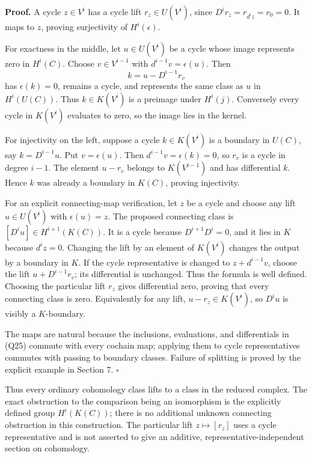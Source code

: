 \documentclass[
]{article}
\begin{document}
\textbf{Proof.} A cycle \(z\in V^i\) has a cycle lift \(r_z\in U(V^i)\),
since \(D^i r_z=r_{d^iz}=r_0=0\). It maps to \(z\), proving surjectivity
of \(H^i(\epsilon)\).

For exactness in the middle, let \(u\in U(V^i)\) be a cycle whose image
represents zero in \(H^i(C)\). Choose \(v\in V^{i-1}\) with
\(d^{i-1}v=\epsilon(u)\). Then \[
k=u-D^{i-1}r_v
\tag{Q27}
\] has \(\epsilon(k)=0\), remains a cycle, and represents the same class
as \(u\) in \(H^i(U(C))\). Thus \(k\in K(V^i)\) is a preimage under
\(H^i(j)\). Conversely every cycle in \(K(V^i)\) evaluates to zero, so
the image lies in the kernel.

For injectivity on the left, suppose a cycle \(k\in K(V^i)\) is a
boundary in \(U(C)\), say \(k=D^{i-1}u\). Put \(v=\epsilon(u)\). Then
\(d^{i-1}v=\epsilon(k)=0\), so \(r_v\) is a cycle in degree \(i-1\). The
element \(u-r_v\) belongs to \(K(V^{i-1})\) and has differential \(k\).
Hence \(k\) was already a boundary in \(K(C)\), proving injectivity.

For an explicit connecting-map verification, let \(z\) be a cycle and
choose any lift \(u\in U(V^i)\) with \(\epsilon(u)=z\). The proposed
connecting class is \([D^iu]\in H^{i+1}(K(C))\). It is a cycle because
\(D^{i+1}D^i=0\), and it lies in \(K\) because \(d^iz=0\). Changing the
lift by an element of \(K(V^i)\) changes the output by a boundary in
\(K\). If the cycle representative is changed to \(z+d^{i-1}v\), choose
the lift \(u+D^{i-1}r_v\); its differential is unchanged. Thus the
formula is well defined. Choosing the particular lift \(r_z\) gives
differential zero, proving that every connecting class is zero.
Equivalently for any lift, \(u-r_z\in K(V^i)\), so \(D^iu\) is visibly a
\(K\)-boundary.

The maps are natural because the inclusions, evaluations, and
differentials in (Q25) commute with every cochain map; applying them to
cycle representatives commutes with passing to boundary classes. Failure
of splitting is proved by the explicit example in Section 7. \(\square\)

Thus every ordinary cohomology class lifts to a class in the reduced
complex. The exact obstruction to the comparison being an isomorphism is
the explicitly defined group \(H^i(K(C))\); there is no additional
unknown connecting obstruction in this construction. The particular lift
\(z\mapsto[r_z]\) uses a cycle representative and is not asserted to
give an additive, representative-independent section on cohomology.
\end{document}
